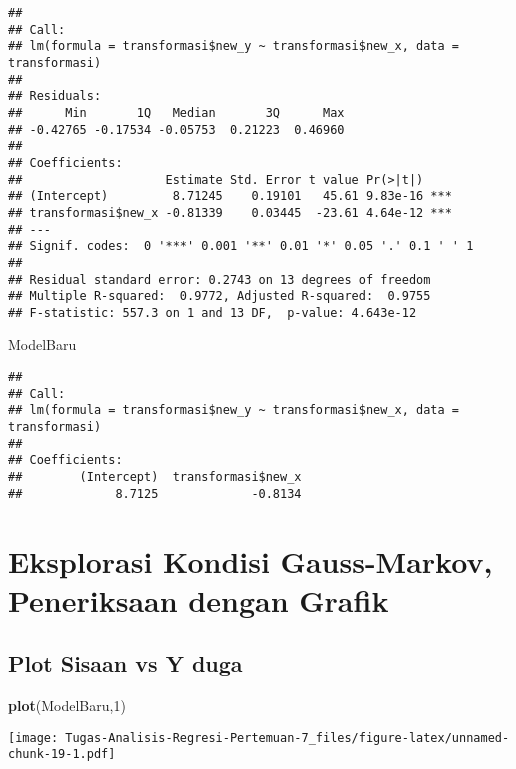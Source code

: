 \documentclass[
]{article}
\newenvironment{Shaded}{\begin{snugshade}}{\end{snugshade}}
\newcommand{\DecValTok}[1]{\textcolor[rgb]{0.00,0.00,0.81}{#1}}
\newcommand{\FunctionTok}[1]{\textcolor[rgb]{0.13,0.29,0.53}{\textbf{#1}}}
\newcommand{\NormalTok}[1]{#1}
\begin{document}
\begin{verbatim}
## 
## Call:
## lm(formula = transformasi$new_y ~ transformasi$new_x, data = transformasi)
## 
## Residuals:
##      Min       1Q   Median       3Q      Max 
## -0.42765 -0.17534 -0.05753  0.21223  0.46960 
## 
## Coefficients:
##                    Estimate Std. Error t value Pr(>|t|)    
## (Intercept)         8.71245    0.19101   45.61 9.83e-16 ***
## transformasi$new_x -0.81339    0.03445  -23.61 4.64e-12 ***
## ---
## Signif. codes:  0 '***' 0.001 '**' 0.01 '*' 0.05 '.' 0.1 ' ' 1
## 
## Residual standard error: 0.2743 on 13 degrees of freedom
## Multiple R-squared:  0.9772, Adjusted R-squared:  0.9755 
## F-statistic: 557.3 on 1 and 13 DF,  p-value: 4.643e-12
\end{verbatim}

\begin{Shaded}
\begin{Highlighting}[]
\NormalTok{ModelBaru}
\end{Highlighting}
\end{Shaded}

\begin{verbatim}
## 
## Call:
## lm(formula = transformasi$new_y ~ transformasi$new_x, data = transformasi)
## 
## Coefficients:
##        (Intercept)  transformasi$new_x  
##             8.7125             -0.8134
\end{verbatim}

\hypertarget{eksplorasi-kondisi-gauss-markov-peneriksaan-dengan-grafik-1}{%
\section{Eksplorasi Kondisi Gauss-Markov, Peneriksaan dengan
Grafik}\label{eksplorasi-kondisi-gauss-markov-peneriksaan-dengan-grafik-1}}

\hypertarget{plot-sisaan-vs-y-duga-1}{%
\subsection{Plot Sisaan vs Y duga}\label{plot-sisaan-vs-y-duga-1}}

\begin{Shaded}
\begin{Highlighting}[]
\FunctionTok{plot}\NormalTok{(ModelBaru,}\DecValTok{1}\NormalTok{)}
\end{Highlighting}
\end{Shaded}

\texttt{[image: Tugas-Analisis-Regresi-Pertemuan-7\_files/figure-latex/unnamed-chunk-19-1.pdf]}
\end{document}
